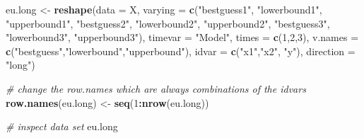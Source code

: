 \documentclass[]{article}
\newenvironment{Shaded}{\begin{snugshade}}{\end{snugshade}}
\newcommand{\CommentTok}[1]{\textcolor[rgb]{0.56,0.35,0.01}{\textit{#1}}}
\newcommand{\DataTypeTok}[1]{\textcolor[rgb]{0.13,0.29,0.53}{#1}}
\newcommand{\DecValTok}[1]{\textcolor[rgb]{0.00,0.00,0.81}{#1}}
\newcommand{\KeywordTok}[1]{\textcolor[rgb]{0.13,0.29,0.53}{\textbf{#1}}}
\newcommand{\NormalTok}[1]{#1}
\newcommand{\OperatorTok}[1]{\textcolor[rgb]{0.81,0.36,0.00}{\textbf{#1}}}
\newcommand{\StringTok}[1]{\textcolor[rgb]{0.31,0.60,0.02}{#1}}
\begin{document}
\begin{Shaded}
\begin{Highlighting}[]
\NormalTok{eu.long <-}\StringTok{ }\KeywordTok{reshape}\NormalTok{(}\DataTypeTok{data =}\NormalTok{ X, }\DataTypeTok{varying =} \KeywordTok{c}\NormalTok{(}\StringTok{"bestguess1"}\NormalTok{, }\StringTok{"lowerbound1"}\NormalTok{, }\StringTok{"upperbound1"}\NormalTok{,}
                                         \StringTok{"bestguess2"}\NormalTok{, }\StringTok{"lowerbound2"}\NormalTok{, }\StringTok{"upperbound2"}\NormalTok{,}
                                         \StringTok{"bestguess3"}\NormalTok{, }\StringTok{"lowerbound3"}\NormalTok{, }\StringTok{"upperbound3"}\NormalTok{),}
                   \DataTypeTok{timevar =} \StringTok{"Model"}\NormalTok{,}
                   \DataTypeTok{times =} \KeywordTok{c}\NormalTok{(}\DecValTok{1}\NormalTok{,}\DecValTok{2}\NormalTok{,}\DecValTok{3}\NormalTok{),}
                   \DataTypeTok{v.names =} \KeywordTok{c}\NormalTok{(}\StringTok{"bestguess"}\NormalTok{,}\StringTok{"lowerbound"}\NormalTok{,}\StringTok{"upperbound"}\NormalTok{),}
                   \DataTypeTok{idvar =} \KeywordTok{c}\NormalTok{(}\StringTok{"x1"}\NormalTok{,}\StringTok{"x2"}\NormalTok{, }\StringTok{"y"}\NormalTok{),}
                   \DataTypeTok{direction =} \StringTok{"long"}\NormalTok{)}

\CommentTok{# change the row.names which are always combinations of the idvars}
\KeywordTok{row.names}\NormalTok{(eu.long) <-}\StringTok{ }\KeywordTok{seq}\NormalTok{(}\DecValTok{1}\OperatorTok{:}\KeywordTok{nrow}\NormalTok{(eu.long))}

\CommentTok{# inspect data set}
\NormalTok{eu.long}
\end{Highlighting}
\end{Shaded}
\end{document}

